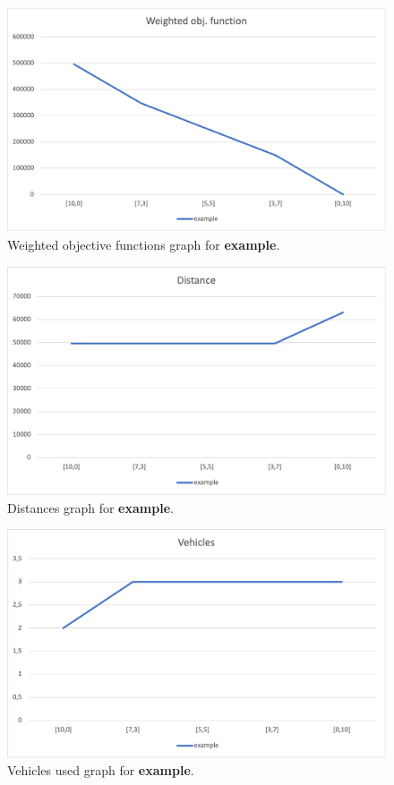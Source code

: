 \begin{figure}[H]
    \centering
    \includegraphics[height=0.25\textheight]{../graphs/example-wobjf.png}
    \caption{Weighted objective functions graph for \textbf{example}.}
\end{figure}

\begin{figure}[H]
    \centering
    \includegraphics[height=0.25\textheight]{../graphs/example-distance.png}
    \caption{Distances graph for \textbf{example}.}
\end{figure}

\begin{figure}[H]
    \centering
    \includegraphics[height=0.25\textheight]{../graphs/example-vehicles.png}
    \caption{Vehicles used graph for \textbf{example}.}
\end{figure}

\newpage